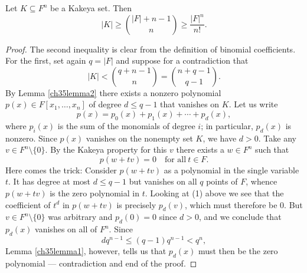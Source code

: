 \begin{theorem}
  \label{kakeya}
  Let $K \subseteq F^n$ be a Kakeya set. Then
\[
|K| \geq \binom{|F| + n - 1}{n} \geq \frac{|F|^n}{n!}.
\]
\end{theorem}
\begin{proof}
  The second inequality is clear from the definition of binomial coefficients. For the first,
  set again $q = |F|$ and suppose for a contradiction that
\[
|K| < \binom{q + n - 1}{n} = \binom{n + q - 1}{q - 1}.
\]
By Lemma \ref{ch35lemma2} there exists a nonzero
polynomial $p(x) \in F[x_1, \dots, x_n]$ of degree $d \leq q - 1$ that
vanishes on $K$. Let us write
\[
p(x) = p_0(x) + p_1(x) + \cdots + p_d(x), \tag{1}
\]
where $p_i(x)$ is the sum of the monomials of degree $i$; in particular, $p_d(x)$ is nonzero.
Since $p(x)$ vanishes on the nonempty set $K$, we have $d > 0$.
Take any $v \in F^n \setminus \{0\}$. By the Kakeya property for this $v$ there
exists a $w \in F^n$ such that
\[
p(w + tv) = 0 \quad \text{for all} \ t \in F.
\]
Here comes the trick: Consider $p(w + tv)$ as a polynomial in the single variable $t$.
It has degree at most $d \leq q - 1$ but vanishes on all $q$ points of $F$,
whence $p(w + tv)$ is the zero polynomial in $t$. Looking at (1) above we see that the
coefficient of $t^d$ in $p(w + tv)$ is precisely $p_d(v)$, which must therefore be 0.
But $v \in F^n \setminus \{0\}$ was arbitrary and $p_d(0) = 0$ since $d > 0$,
and we conclude that $p_d(x)$ vanishes on all of $F^n$. Since
\[
dq^{n-1} \leq (q - 1)q^{n-1} < q^n,
\]
Lemma \ref{ch35lemma1}, however, tells us that $p_d(x)$ must then be the zero polynomial —
contradiction and end of the proof.

\end{proof}
